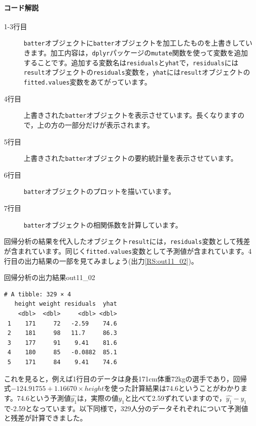 \documentclass{ltjbook}
\begin{document}
\paragraph{コード解説}
\begin{description}
    \item[1-3行目] \verb|batter|オブジェクトに\verb|batter|オブジェクトを加工したものを上書きしていきます。加工内容は，\verb|dplyr|パッケージの\verb|mutate|関数を使って変数を追加することです。追加する変数名は\verb|residuals|と\verb|yhat|で，\verb|residuals|には\verb|result|オブジェクトの\verb|residuals|変数を，\verb|yhat|には\verb|result|オブジェクトの\verb|fitted.values|変数をあてがっています。
    \item[4行目] 上書きされた\verb|batter|オブジェクトを表示させています。長くなりますので，上の方の一部分だけが表示されます。
    \item[5行目] 上書きされた\verb|batter|オブジェクトの要約統計量を表示させています。
    \item[6行目] \verb|batter|オブジェクトのプロットを描いています。
    \item[7行目] \verb|batter|オブジェクトの相関係数を計算しています。
\end{description}

回帰分析の結果を代入したオブジェクト\verb|result|には，\verb|residuals|変数として残差が含まれています。同じく\verb|fitted.values|変数として予測値が含まれています。4行目の出力結果の一部を見てみましょう(出力\ref{RS:out11_02})。
\begin{Rscreen}{回帰分析の出力結果}{out11_02}
\begin{verbatim}
# A tibble: 329 × 4
   height weight residuals  yhat
    <dbl>  <dbl>     <dbl> <dbl>
 1    171     72   -2.59    74.6
 2    181     98   11.7     86.3
 3    177     91    9.41    81.6
 4    180     85   -0.0882  85.1
 5    171     84    9.41    74.6
\end{verbatim}
\end{Rscreen}

これを見ると，例えば1行目のデータは身長171cm体重72kgの選手であり，回帰式$-124.91755 + 1.16670 \times height$を使った計算結果は74.6ということがわかります。74.6という予測値$\hat{y_1}$は，実際の値$y_1$と比べて2.59ずれていますので，$\hat{y_1}-y_1$で-2.59となっています。以下同様で，329人分のデータそれぞれについて予測値と残差が計算できました。
\end{document}
